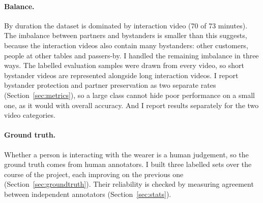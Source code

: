 \begin{table}[htbp]
\begin{singlespace}
\centering
\caption{Labelled data points used for evaluation. A data point is one person (face track)
with a human label and a system decision.}
\label{tab:datapoints}
\renewcommand{\arraystretch}{1.3}
\end{singlespace}
\end{table}

\paragraph{Balance.}
By duration the dataset is dominated by interaction video (70 of 73 minutes). The
imbalance between partners and bystanders is smaller than this suggests, because the
interaction videos also contain many bystanders: other customers, people at other tables
and passers-by. I handled the remaining imbalance in three ways. The labelled evaluation
samples were drawn from every video, so short bystander videos are represented alongside
long interaction videos. I report bystander protection and partner preservation as two
separate rates (Section~\ref{sec:metrics}), so a large class cannot hide poor
performance on a small one, as it would with overall accuracy. And I report results
separately for the two video categories.

\paragraph{Ground truth.}
Whether a person is interacting with the wearer is a human judgement, so the ground truth
comes from human annotators. I built three labelled sets over the course of the project,
each improving on the previous one (Section~\ref{sec:groundtruth}). Their reliability is
checked by measuring agreement between independent annotators (Section~\ref{sec:stats}).

